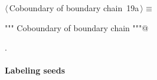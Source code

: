 \documentclass[11pt,oneside]{article}	%
\begin{document}
\begin{flushleft} \small \label{scrap20}
\protect{}$\langle\,$Coboundary of boundary chain\nobreak\ {\footnotesize 19a}$\,\rangle\equiv$
\vspace{-1ex}
\begin{list}{}{} \item
\mbox{}\verb@""" Coboundary of boundary chain """@\\
\mbox{}\verb@@{\NWsep}
\end{list}
\vspace{-1ex}
\footnotesize\addtolength{\baselineskip}{-1ex}
\begin{list}{}{\setlength{\itemsep}{-\parsep}\setlength{\itemindent}{-\leftmargin}}
\item {\NWtxtMacroNoRef}.
\end{list}
\end{flushleft}


\paragraph{Labeling seeds}
\end{document}
